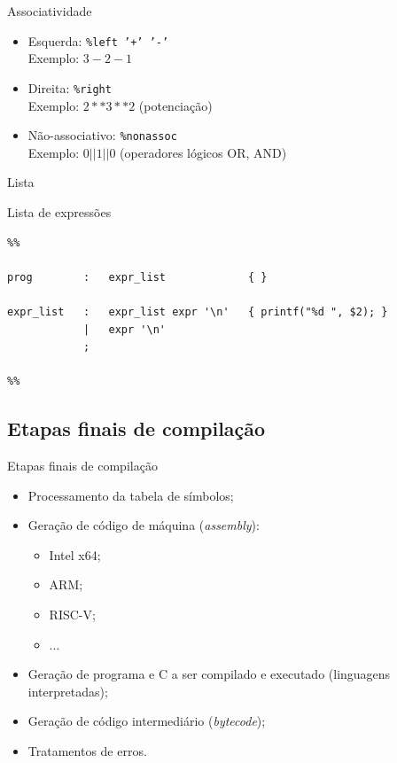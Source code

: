 \begin{frame}{Associatividade}

  \begin{itemize}
    \item Esquerda: {\tt \%left '+' '-'}\\
      Exemplo: $3 - 2 - 1$
     \bigskip
    \item Direita:  {\tt \%right}\\
     Exemplo:   $2 ** 3 ** 2$ \hfil (potenciação)
     \bigskip
    \item Não-associativo: {\tt \%nonassoc}\\
      Exemplo: $0 || 1 || 0$  \hfil (operadores lógicos OR, AND)
  \end{itemize}
\end{frame}

\begin{frame}[fragile]{Lista}

  Lista de expressões

 \begin{lstlisting}
%%

prog        :   expr_list             { }

expr_list   :   expr_list expr '\n'   { printf("%d ", $2); }
            |   expr '\n' 
            ;

%%
\end{lstlisting}
\end{frame}
 

\subsection{Etapas finais de compilação}
\frame{\tableofcontents[currentsubsection]}

\begin{frame}{Etapas finais de compilação}

  \begin{itemize}
  \item Processamento da tabela de símbolos;
  \item Geração de código de máquina ({\it assembly}):
    \begin{itemize}
    \item Intel x64;
    \item ARM;
    \item RISC-V;
    \item $\ldots$
    \end{itemize}
  \item Geração de programa e C a ser compilado e executado
    (linguagens interpretadas);
  \item Geração de código intermediário ({\it bytecode});
  \item Tratamentos de erros.
  \end{itemize}
\end{frame}

